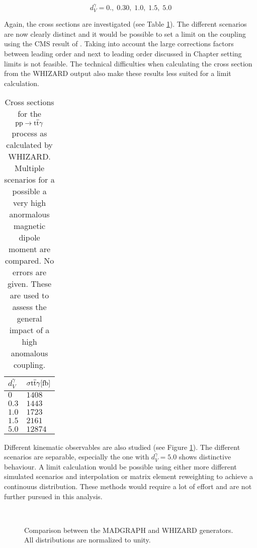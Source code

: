 \begin{equation}
d_V^{\gamma} = 0.,\; 0.30,\; 1.0,\;1.5,\; 5.0
\label{eq_ano_val_ex}
\end{equation}

Again, the cross sections are investigated (see Table \ref{tab_ano_crosssec_ex}). The different scenarios are now clearly distinct and it would be possible to set a limit on the coupling using the CMS result of . Taking into account the large corrections factors between leading order and next to leading order discussed in Chapter  setting limits is not feasible. The technical difficulties when calculating the cross section from the WHIZARD output also make these results less suited for a limit calculation. \\

\begin{table}[ht]
\centering
    \caption{Cross sections for the $\mathrm{pp} \to \mathrm{t}\overline{\mathrm{t}} \gamma$ process as calculated by WHIZARD. Multiple scenarios for a possible a very high anormalous magnetic dipole moment are compared. No errors are given. These are used to assess the general impact of a high anomalous coupling.}
    \begin{tabular}{| l | l |}

    \hline
    $d_{V}^{\gamma}$ & $\sigma{\ttgamma} [\SI{}{\femto \barn}]$ \\
    \hline
    $0$ &  $1408$\\
    \hline
    $0.3$ & $1443 $ \\
    \hline
    $1.0$ & $1723 $ \\
    \hline
    $1.5$ & $2161 $ \\
    \hline
    $5.0$ &  $12874 $\\
    \hline
    \end{tabular}
     \label{tab_ano_crosssec_ex}
\end{table}

Different kinematic observables are also studied (see Figure \ref{fig_ano_comp_ex}). The different scenarios are separable, especially the one with $d_{V}^{\gamma} = 5.0$ shows distinctive behaviour. A limit calculation would be possible using either more different simulated scenarios and interpolation or  matrix element reweighting to achieve a continouus distribution. These methods would require a lot of effort and are not further pursued in this analysis.

\begin{figure}
  \\
  \caption{Comparison between the MADGRAPH and WHIZARD generators. All distributions are normalized to unity. }
  \label{fig_ano_comp_ex}
\end{figure}

